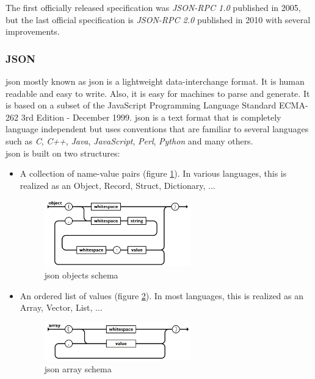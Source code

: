 \documentclass[a4paper, 12pt]{article} %
\begin{document}
        The first officially released specification was \textit{JSON-RPC 1.0}\cite{json-rpc-1} published in 2005, but the last official specification is \textit{JSON-RPC 2.0}\cite{json-rpc-2} published in 2010 with several improvements.
        
        \subsubsection{JSON}
            \acrlong{json} mostly known as \acrshort{json} is a lightweight data-interchange format. It is human readable and easy to write. Also, it is easy for machines to parse and generate. It is based on a subset of the JavaScript Programming Language Standard ECMA-262 3rd Edition - December 1999. \acrshort{json} is a text format that is completely language independent but uses conventions that are familiar to several languages such as \textit{C}, \textit{C++}, \textit{Java}, \textit{JavaScript}, \textit{Perl}, \textit{Python} and many others.\\
                        
            \acrshort{json} is built on two structures\cite{jsonSchema}:
            \begin{itemize}
                \item A collection of name-value pairs (figure \ref{fig:json_objects}). In various languages, this is realized as an Object, Record, Struct, Dictionary, ...
                \begin{figure}[h]
                    \centering
                    \includegraphics[width=0.6\textwidth]{json-objects.png}
                    \caption{\acrshort{json} objects schema}
                    \label{fig:json_objects}
                \end{figure}
                \item An ordered list of values (figure \ref{fig:json_arrays}). In most languages, this is realized as an Array, Vector, List, ...
                \begin{figure}[h]
                    \centering
                    \includegraphics[width=0.6\textwidth]{json-arrays.png}
                    \caption{\acrshort{json} array schema}
                    \label{fig:json_arrays}
                \end{figure}
            \end{itemize}
\end{document}
